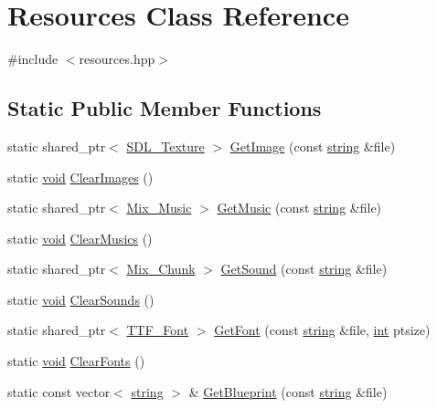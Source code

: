 \hypertarget{class_resources}{\section{Resources Class Reference}
\label{class_resources}
}


{\ttfamily \#include $<$resources.\-hpp$>$}

\subsection*{Static Public Member Functions}
\begin{DoxyCompactItemize}
\item 
static shared\-\_\-ptr$<$ \hyperlink{_s_d_l__render_8h_a17850d7f1f5de457727cb3cf66b3a7f5}{S\-D\-L\-\_\-\-Texture} $>$ \hyperlink{class_resources_af87778f384121b88618e544a9824e950}{Get\-Image} (const \hyperlink{_s_d_l__opengl__glext_8h_ae84541b4f3d8e1ea24ec0f466a8c568b}{string} \&file)
\item 
static \hyperlink{_s_d_l__opengles2__gl2ext_8h_ae5d8fa23ad07c48bb609509eae494c95}{void} \hyperlink{class_resources_ae5940f0c83f06291888c1e7ccf194aa7}{Clear\-Images} ()
\item 
static shared\-\_\-ptr$<$ \hyperlink{_s_d_l__mixer_8h_a1d58ae8fa29e1c03df23baeffb32b14c}{Mix\-\_\-\-Music} $>$ \hyperlink{class_resources_ae5b51765b6084ce39c3cd0ec9628e9c3}{Get\-Music} (const \hyperlink{_s_d_l__opengl__glext_8h_ae84541b4f3d8e1ea24ec0f466a8c568b}{string} \&file)
\item 
static \hyperlink{_s_d_l__opengles2__gl2ext_8h_ae5d8fa23ad07c48bb609509eae494c95}{void} \hyperlink{class_resources_ad4145fbf874bf11c94b2a6ba920cc3c3}{Clear\-Musics} ()
\item 
static shared\-\_\-ptr$<$ \hyperlink{struct_mix___chunk}{Mix\-\_\-\-Chunk} $>$ \hyperlink{class_resources_a08f9f1417a15a371ced6aa17325edb35}{Get\-Sound} (const \hyperlink{_s_d_l__opengl__glext_8h_ae84541b4f3d8e1ea24ec0f466a8c568b}{string} \&file)
\item 
static \hyperlink{_s_d_l__opengles2__gl2ext_8h_ae5d8fa23ad07c48bb609509eae494c95}{void} \hyperlink{class_resources_aa7e8b6a72ec46ce1444bbc2e042b910d}{Clear\-Sounds} ()
\item 
static shared\-\_\-ptr$<$ \hyperlink{_s_d_l__ttf_8h_ac3b14e1c2946c0cf19776fe568d9abcf}{T\-T\-F\-\_\-\-Font} $>$ \hyperlink{class_resources_ab8bb0ae619a6f8b319878ae11e836c2f}{Get\-Font} (const \hyperlink{_s_d_l__opengl__glext_8h_ae84541b4f3d8e1ea24ec0f466a8c568b}{string} \&file, \hyperlink{_s_d_l__thread_8h_a6a64f9be4433e4de6e2f2f548cf3c08e}{int} ptsize)
\item 
static \hyperlink{_s_d_l__opengles2__gl2ext_8h_ae5d8fa23ad07c48bb609509eae494c95}{void} \hyperlink{class_resources_a31a3a29c47e49a4430ac09d6c232b489}{Clear\-Fonts} ()
\item 
static const vector$<$ \hyperlink{_s_d_l__opengl__glext_8h_ae84541b4f3d8e1ea24ec0f466a8c568b}{string} $>$ \& \hyperlink{class_resources_ac1f3d4e2f51e42a627073e74af214170}{Get\-Blueprint} (const \hyperlink{_s_d_l__opengl__glext_8h_ae84541b4f3d8e1ea24ec0f466a8c568b}{string} \&file)
\end{DoxyCompactItemize}



